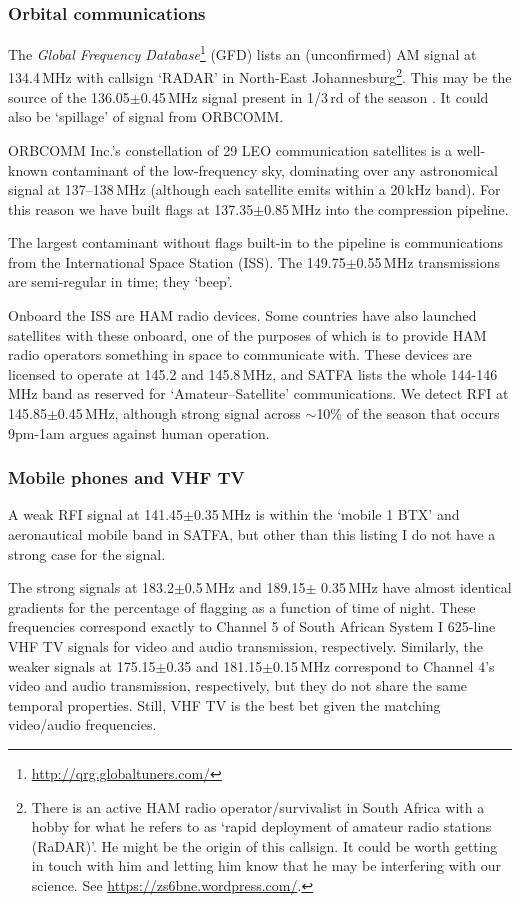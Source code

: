\documentclass[10pt,a4paper]{article}
\begin{document}
\subsubsection{Orbital communications}
The \textit{Global Frequency Database}\footnote{\url{http://qrg.globaltuners.com/}} (GFD) lists an (unconfirmed) AM signal at 134.4\,MHz with callsign `RADAR' in  North-East Johannesburg\footnote{There is an active HAM radio operator/survivalist in South Africa with a hobby for what he refers to as `rapid deployment of amateur radio stations (RaDAR)'. He might be the origin of this callsign. It could be worth getting in touch with him and letting him know that he may be interfering with our science. See \url{https://zs6bne.wordpress.com/}.}. This may be the source of the 136.05$\pm$0.45\,MHz signal present in 1/3\,rd of the season	. It could also be `spillage' of signal from ORBCOMM. 

ORBCOMM Inc.'s constellation of 29 LEO communication satellites is a well-known contaminant of the low-frequency sky, dominating over any astronomical signal at 137--138\,MHz (although each satellite emits within a 20\,kHz band). For this reason we have built flags at 137.35$\pm$0.85\,MHz into the compression pipeline.

The largest contaminant without flags built-in to the pipeline is communications from the International Space Station (ISS). The 149.75$\pm$0.55\,MHz transmissions are semi-regular in time; they `beep'.  

Onboard the ISS are HAM radio devices. Some countries have also launched satellites with these onboard, one of the purposes of which is to provide HAM radio operators something in space to communicate with. These devices are licensed to operate at 145.2 and 145.8\,MHz, and SATFA lists the whole 144-146\,MHz band as reserved for `Amateur--Satellite' communications. We detect RFI at 145.85$\pm$0.45\,MHz, although strong signal across $\sim$10\% of the season that occurs 9pm-1am argues against human operation. 

\subsubsection{Mobile phones and VHF TV}

A weak RFI signal at 141.45$\pm$0.35\,MHz is within the `mobile 1 BTX'  and aeronautical mobile band in SATFA, but other than this listing I do not have a strong case for the signal.

The strong signals at 183.2$\pm$0.5\,MHz and 189.15$\pm$	0.35\,MHz have almost identical gradients for the percentage of flagging as a function of time of night. These frequencies correspond exactly to Channel 5 of South African System I 625-line VHF TV signals for video and audio transmission, respectively. Similarly, the weaker signals at 175.15$\pm$0.35	 and 181.15$\pm$0.15\,MHz correspond to Channel 4's video and audio transmission, respectively, but they do not share the same temporal properties. Still, VHF TV is the best bet given the matching video/audio frequencies.
\end{document}
